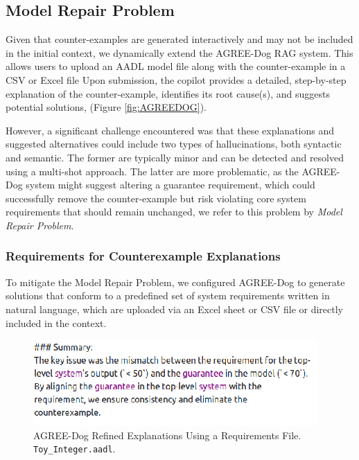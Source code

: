 \subsection{Model Repair Problem}

Given that counter-examples are generated interactively and may not be included in the initial context, we dynamically extend the AGREE-Dog RAG system. This allows users to upload an AADL model file along with the counter-example in a CSV or Excel file %
Upon submission, the copilot provides a detailed, step-by-step explanation of the counter-example, identifies its root cause(s), and suggests potential solutions, (Figure \ref{fig:AGREEDOG}). 


However, a significant challenge encountered was that these explanations and suggested alternatives could include two types of hallucinations, both syntactic and semantic. The former are typically minor and can be detected and resolved using a multi-shot approach. The latter are more problematic, as the AGREE-Dog system might suggest altering a guarantee requirement, which could successfully remove the counter-example but risk violating core system requirements that should remain unchanged, we refer to this problem by \textit{Model Repair Problem}. 


\subsubsection{Requirements for Counterexample Explanations}

To mitigate the Model Repair Problem, we configured AGREE-Dog to generate solutions that conform to a predefined set of system requirements written in natural language, which are uploaded via an Excel sheet or CSV file or directly included in the context. 

\begin{figure}[t]  
    \centering
    \includegraphics[width=0.95\columnwidth]{REQ-AWARE-REF.png}  
    \caption{AGREE-Dog Refined Explanations Using a Requirements File. \texttt{Toy\_Integer.aadl}.}
    \label{fig:REQ-AWARE-EXPL}
\end{figure}



